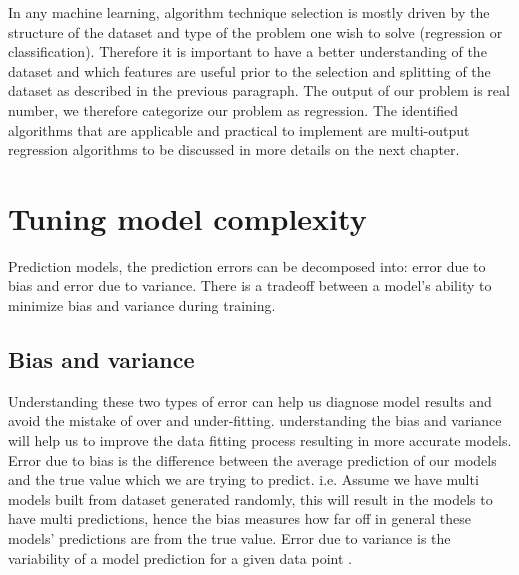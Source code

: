 In any machine learning, algorithm technique selection is mostly driven by the structure of the dataset and type of the problem one wish to solve (regression or classification). Therefore it is important to have a better understanding of the dataset and which features are useful prior to the selection and splitting of the dataset as described in the previous paragraph. The output of our problem is real number, we therefore categorize our problem as regression. The identified algorithms that are applicable and practical to implement are multi-output regression algorithms to be discussed in more details on the next chapter. 


\section{Tuning model complexity}
\label{comp}
Prediction models, the prediction errors can be decomposed into: error due to bias and error due to variance. There is a tradeoff between a model's ability to minimize bias and variance during training. 
\subsection{Bias and variance }
Understanding these two types of error can help us diagnose model results and avoid the mistake of over and under-fitting. understanding the bias and variance will help us to improve the data fitting process resulting in more accurate models.
Error due to bias is the difference between the average prediction of our models and the true value which we are trying to predict. i.e. Assume we have multi models built from dataset generated randomly, this will result in the models to have multi predictions, hence the bias measures how far off in general these models' predictions are from the true value. Error due to variance is the variability of a model prediction for a given data point \citep{fortmann2012understanding}. 

